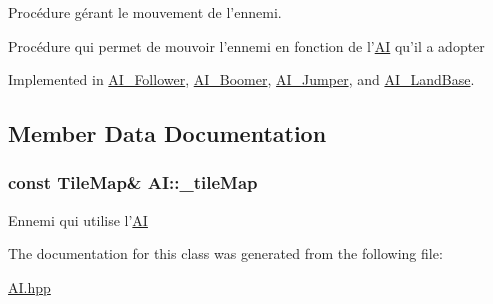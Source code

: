 Procédure gérant le mouvement de l'ennemi. 

Procédure qui permet de mouvoir l'ennemi en fonction de l'\hyperlink{class_a_i}{A\+I} qu'il a adopter 

Implemented in \hyperlink{class_a_i___follower_a37893e7aa601169682333af093235c13}{A\+I\+\_\+\+Follower}, \hyperlink{class_a_i___boomer_a7fc6dbcfbc0a2aa557614bfb47935df6}{A\+I\+\_\+\+Boomer}, \hyperlink{class_a_i___jumper_a49e2ba05ef7f14020faf4f521370dbfa}{A\+I\+\_\+\+Jumper}, and \hyperlink{class_a_i___land_base_af536a9f2a45fd52189542761bcf285d4}{A\+I\+\_\+\+Land\+Base}.



\subsection{Member Data Documentation}
\hypertarget{class_a_i_a5b798605999a06067b97a45c6e7f2dc2}{
\subsubsection[{\+\_\+tile\+Map}]{\setlength{\rightskip}{0pt plus 5cm}const {\bf Tile\+Map}\& A\+I\+::\+\_\+tile\+Map\hspace{0.3cm}{\ttfamily [protected]}}}\label{class_a_i_a5b798605999a06067b97a45c6e7f2dc2}
Ennemi qui utilise l'\hyperlink{class_a_i}{A\+I} 

The documentation for this class was generated from the following file\+:\begin{DoxyCompactItemize}
\item 
\hyperlink{_a_i_8hpp}{A\+I.\+hpp}\end{DoxyCompactItemize}
